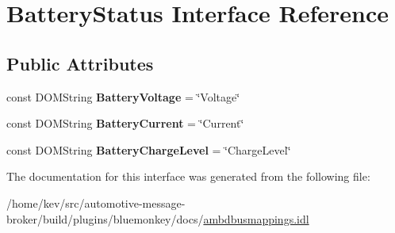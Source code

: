\hypertarget{interfaceBatteryStatus}{\section{Battery\+Status Interface Reference}
\label{interfaceBatteryStatus}
}
\subsection*{Public Attributes}
\begin{DoxyCompactItemize}
\item 
\hypertarget{interfaceBatteryStatus_afb14133e6ba7b0e975c9d8202240eafd}{const D\+O\+M\+String {\bfseries Battery\+Voltage} = \char`\"{}Voltage\char`\"{}}\label{interfaceBatteryStatus_afb14133e6ba7b0e975c9d8202240eafd}

\item 
\hypertarget{interfaceBatteryStatus_ac0cd6fdef88ab9c883bd7102d3d56b67}{const D\+O\+M\+String {\bfseries Battery\+Current} = \char`\"{}Current\char`\"{}}\label{interfaceBatteryStatus_ac0cd6fdef88ab9c883bd7102d3d56b67}

\item 
\hypertarget{interfaceBatteryStatus_a82efd679635044f40e77f32b682caf9d}{const D\+O\+M\+String {\bfseries Battery\+Charge\+Level} = \char`\"{}Charge\+Level\char`\"{}}\label{interfaceBatteryStatus_a82efd679635044f40e77f32b682caf9d}

\end{DoxyCompactItemize}


The documentation for this interface was generated from the following file\+:\begin{DoxyCompactItemize}
\item 
/home/kev/src/automotive-\/message-\/broker/build/plugins/bluemonkey/docs/\hyperlink{ambdbusmappings_8idl}{ambdbusmappings.\+idl}\end{DoxyCompactItemize}

